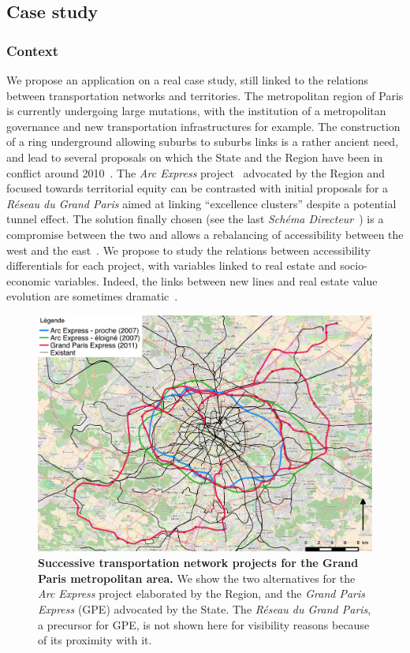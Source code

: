 \documentclass[english]{./sageo}
\begin{document}
\subsection{Case study}


\subsubsection{Context}

We propose an application on a real case study, still linked to the relations between transportation networks and territories. The metropolitan region of Paris is currently undergoing large mutations, with the institution of a metropolitan governance and new transportation infrastructures for example. The construction of a ring underground allowing suburbs to suburbs links is a rather ancient need, and lead to several proposals on which the State and the Region have been in conflict around 2010~\cite{desjardins2010bataille}. The \emph{Arc Express} project~\cite{stif2007arc} advocated by the Region and focused towards territorial equity can be contrasted with initial proposals for a \emph{Réseau du Grand Paris} aimed at linking ``excellence clusters'' despite a potential tunnel effect. The solution finally chosen (see the last \emph{Schéma Directeur}~\cite{sdrif2013}) is a compromise between the two and allows a rebalancing of accessibility between the west and the east~\cite{beaucire2013grand}. We propose to study the relations between accessibility differentials for each project, with variables linked to real estate and socio-economic variables. Indeed, the links between new lines and real estate value evolution are sometimes dramatic~\cite{damm1980response}. 




\begin{figure}[h]
\centering
\includegraphics[width=12cm]{reseaux}
\caption{\textbf{Successive transportation network projects for the Grand Paris metropolitan area.} We show the two alternatives for the \emph{Arc Express} project elaborated by the Region, and the \emph{Grand Paris Express} (GPE) advocated by the State. The \emph{Réseau du Grand Paris}, a precursor for GPE, is not shown here for visibility reasons because of its proximity with it.}
\label{fig:projects}
\end{figure}
\end{document}
